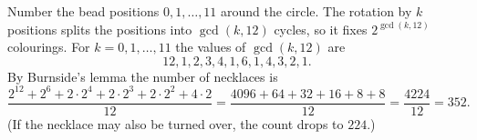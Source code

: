 Number the bead positions $0,1,\dots,11$ around the circle. The rotation by $k$ positions splits the positions into $\gcd(k,12)$ cycles, so it fixes $2^{\gcd(k,12)}$ colourings. For $k=0,1,\dots,11$ the values of $\gcd(k,12)$ are
\[12,1,2,3,4,1,6,1,4,3,2,1.\]
By Burnside's lemma the number of necklaces is
\[\dfrac{2^{12}+2^6+2\cdot2^4+2\cdot2^3+2\cdot2^2+4\cdot2}{12}=\dfrac{4096+64+32+16+8+8}{12}=\dfrac{4224}{12}=\boxed{352}.\]
(If the necklace may also be turned over, the count drops to $224$.)
